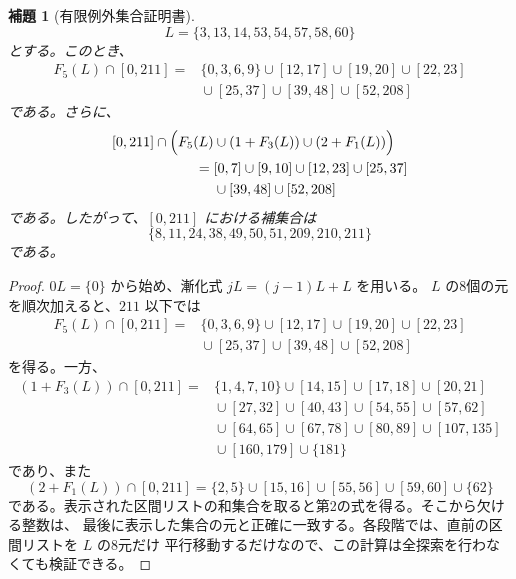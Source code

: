 \documentclass[12pt]{ltjsarticle}
\theoremstyle{plain}
\newtheorem{lemma}[theorem]{補題}
\begin{document}
\begin{lemma}[有限例外集合証明書]\label{lem:finiteexception}
\[
 L=\{3,13,14,53,54,57,58,60\}
\]
とする。このとき、
\[
\begin{aligned}
F_5(L)\cap[0,211]
={}&\{0,3,6,9\}\cup[12,17]\cup[19,20]\cup[22,23]\\
 &{}\cup[25,37]\cup[39,48]\cup[52,208]
\end{aligned}
\]
である。さらに、
\[
\begin{aligned}
[0,211]\cap\Bigl(F_5(L)&\cup(1+F_3(L))\cup(2+F_1(L))\Bigr)\\
={}&[0,7]\cup[9,10]\cup[12,23]\cup[25,37]\\
 &{}\cup[39,48]\cup[52,208]
\end{aligned}
\]
である。したがって、$[0,211]$ における補集合は
\[
 \{8,11,24,38,49,50,51,209,210,211\}
\]
である。
\end{lemma}

\begin{proof}
$0L=\{0\}$ から始め、漸化式 $jL=(j-1)L+L$ を用いる。
$L$ の8個の元を順次加えると、$211$ 以下では
\[
\begin{aligned}
F_5(L)\cap[0,211]={}&\{0,3,6,9\}\cup[12,17]\cup[19,20]\cup[22,23]\\
 &{}\cup[25,37]\cup[39,48]\cup[52,208]
\end{aligned}
\]
を得る。一方、
\[
\begin{aligned}
(1+F_3(L))\cap[0,211]
={}&\{1,4,7,10\}\cup[14,15]\cup[17,18]\cup[20,21]\\
 &{}\cup[27,32]\cup[40,43]\cup[54,55]\cup[57,62]\\
 &{}\cup[64,65]\cup[67,78]\cup[80,89]\cup[107,135]\\
 &{}\cup[160,179]\cup\{181\}
\end{aligned}
\]
であり、また
\[
 (2+F_1(L))\cap[0,211]
 =\{2,5\}\cup[15,16]\cup[55,56]\cup[59,60]\cup\{62\}
\]
である。表示された区間リストの和集合を取ると第2の式を得る。そこから欠ける整数は、
最後に表示した集合の元と正確に一致する。各段階では、直前の区間リストを $L$ の8元だけ
平行移動するだけなので、この計算は全探索を行わなくても検証できる。
\end{proof}
\end{document}
